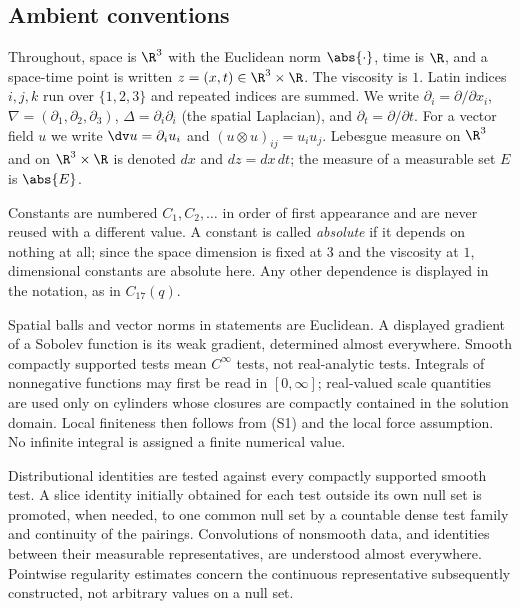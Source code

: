 \documentclass[11pt,reqno]{amsart}
\begin{document}
\subsection{Ambient conventions}\label{ss:ambient}

Throughout, space is $\R^{3}$ with the Euclidean norm $\abs{\cdot}$, time is
$\R$, and a space-time point is written $z=(x,t)\in\R^{3}\times\R$. The
viscosity is $1$. Latin indices $i,j,k$ run over $\{1,2,3\}$ and repeated
indices are summed. We write $\partial_{i}=\partial/\partial x_{i}$,
$\nabla=(\partial_{1},\partial_{2},\partial_{3})$,
$\Delta=\partial_{i}\partial_{i}$ (the spatial Laplacian), and
$\partial_{t}=\partial/\partial t$. For a vector field $u$ we write
$\dv u=\partial_{i}u_{i}$ and $(u\otimes u)_{ij}=u_{i}u_{j}$. Lebesgue measure
on $\R^{3}$ and on $\R^{3}\times\R$ is denoted $dx$ and $dz=dx\,dt$; the measure
of a measurable set $E$ is $\abs{E}$.

\begin{convention}\label{conv:constants}
Constants are numbered $C_{1},C_{2},\dots$ in order of first appearance and are
never reused with a different value. A constant is called \emph{absolute} if it
depends on nothing at all; since the space dimension is fixed at $3$ and the
viscosity at $1$, dimensional constants are absolute here. Any other dependence
is displayed in the notation, as in $C_{17}(q)$.
\end{convention}

\begin{convention}
Spatial balls and vector norms in statements are Euclidean. A displayed
gradient of a Sobolev function is its weak gradient, determined almost
everywhere. Smooth compactly supported tests mean $C^\infty$ tests, not
real-analytic tests. Integrals of nonnegative functions may first be read in
$[0,\infty]$; real-valued scale quantities are used only on cylinders whose
closures are compactly contained in the solution domain. Local finiteness
then follows from (S1) and the local force assumption. No infinite integral
is assigned a finite numerical value.

Distributional identities are tested against every compactly supported
smooth test. A slice identity initially obtained for each test outside its
own null set is promoted, when needed, to one common null set by a countable
dense test family and continuity of the pairings. Convolutions of nonsmooth
data, and identities between their measurable representatives, are understood
almost everywhere. Pointwise regularity estimates concern the continuous
representative subsequently constructed, not arbitrary values on a null set.
\end{convention}
\end{document}
